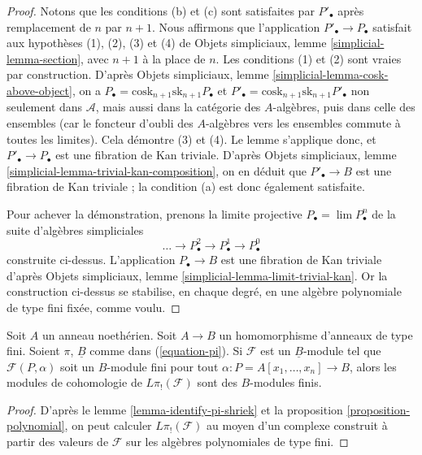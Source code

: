 \begin{proof}
\medskip\noindent
Notons que les conditions (b) et (c) sont satisfaites par $P'_\bullet$ après
remplacement de $n$ par $n + 1$. Nous affirmons que l'application
$P'_\bullet \to P_\bullet$ satisfait aux hypothèses (1), (2), (3) et (4) de
Objets simpliciaux, lemme \ref{simplicial-lemma-section}, avec $n + 1$ à la
place de $n$. Les conditions (1) et (2) sont vraies par construction. D'après
Objets simpliciaux, lemme \ref{simplicial-lemma-cosk-above-object}, on a
$P_\bullet = \text{cosk}_{n + 1}\text{sk}_{n + 1}P_\bullet$
et
$P'_\bullet = \text{cosk}_{n + 1}\text{sk}_{n + 1}P'_\bullet$
non seulement dans $\mathcal{A}$, mais aussi dans la catégorie des
$A$-algèbres, puis dans celle des ensembles (car le foncteur d'oubli des
$A$-algèbres vers les ensembles commute à toutes les limites). Cela démontre
(3) et (4). Le lemme s'applique donc, et
$P'_\bullet \to P_\bullet$ est une fibration de Kan triviale. D'après Objets
simpliciaux, lemme \ref{simplicial-lemma-trivial-kan-composition}, on en déduit
que $P'_\bullet \to B$ est une fibration de Kan triviale ; la condition (a)
est donc également satisfaite.

\medskip\noindent
Pour achever la démonstration, prenons la limite projective
$P_\bullet = \lim P^n_\bullet$ de la suite d'algèbres simpliciales
$$
\ldots \to P^2_\bullet \to P^1_\bullet \to P^0_\bullet
$$
construite ci-dessus. L'application $P_\bullet \to B$ est une fibration de Kan
triviale d'après Objets simpliciaux, lemme
\ref{simplicial-lemma-limit-trivial-kan}. Or la construction ci-dessus se
stabilise, en chaque degré, en une algèbre polynomiale de type fini fixée,
comme voulu.
\end{proof}

\begin{lemma}
\label{lemma-pi-shriek-finite}
Soit $A$ un anneau noethérien. Soit $A \to B$ un homomorphisme d'anneaux de
type fini. Soient $\pi$, $\underline{B}$ comme dans (\ref{equation-pi}).
Si $\mathcal{F}$ est un $\underline{B}$-module tel que
$\mathcal{F}(P, \alpha)$ soit un $B$-module fini pour tout
$\alpha : P = A[x_1, \ldots, x_n] \to B$, alors les modules de cohomologie de
$L\pi_!(\mathcal{F})$ sont des $B$-modules finis.
\end{lemma}

\begin{proof}
D'après le lemme \ref{lemma-identify-pi-shriek} et la proposition
\ref{proposition-polynomial}, on peut calculer $L\pi_!(\mathcal{F})$ au moyen
d'un complexe construit à partir des valeurs de $\mathcal{F}$ sur les algèbres
polynomiales de type fini.
\end{proof}

